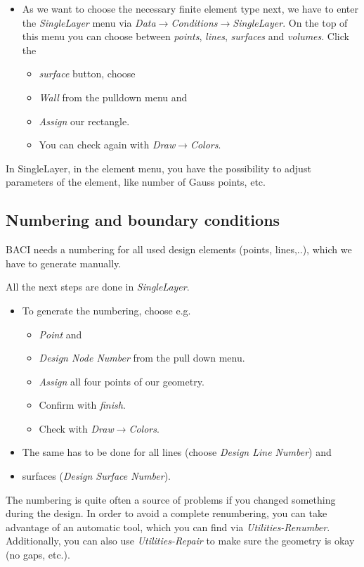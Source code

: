 \begin{itemize}
\item As we want to choose the necessary finite element type next, we have
to enter the \emph{SingleLayer} menu via \emph{Data$\to$Conditions$\to$SingleLayer}.
On the top of this menu you can choose between \emph{points}, \emph{lines},
\emph{surfaces} and \emph{volumes}. Click the

\begin{itemize}
\item \emph{surface} button, choose
\item \emph{Wall} from the pulldown menu and
\item \emph{Assign} our rectangle.
\item You can check again with \emph{Draw$\to$Colors}.
\end{itemize}
\end{itemize}
In SingleLayer, in the element menu, you have the possibility to adjust
parameters of the element, like number of Gauss points, etc.


\subsection{Numbering and boundary conditions}

BACI needs a numbering for all used design elements (points, lines,..),
which we have to generate manually.

All the next steps are done in \emph{SingleLayer}.

\begin{itemize}
\item To generate the numbering, choose e.g.

\begin{itemize}
\item \emph{Point} and
\item \emph{Design Node Number} from the pull down menu.
\item \emph{Assign} all four points of our geometry.
\item Confirm with \emph{finish}.
\item Check with \emph{Draw$\to$Colors}.
\end{itemize}
\item The same has to be done for all lines (choose \emph{Design Line Number})
and
\item surfaces (\emph{Design Surface Number}).
\end{itemize}
The numbering is quite often a source of problems if you changed something
during the design. In order to avoid a complete renumbering, you can
take advantage of an automatic tool, which you can find via \emph{Utilities-Renumber}.
Additionally, you can also use \emph{Utilities-Repair} to make sure
the geometry is okay (no gaps, etc.).

